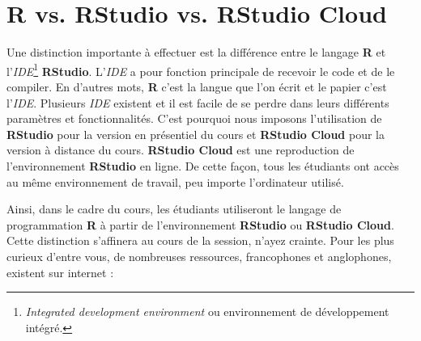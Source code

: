 \documentclass[10.5pt,a4paper]{article}
\begin{document}
\section{R vs. RStudio vs. RStudio Cloud}\label{R vs RStudio vs RStudio Cloud}

Une distinction importante à effectuer est la différence entre le langage \textbf{R} et l'\textit{IDE}\footnote{\emph{Integrated development environment} ou environnement de développement intégré.} \textbf{RStudio}. L'\textit{IDE} a pour fonction principale de recevoir le code et de le compiler. En d'autres mots, \textbf{R} c'est la langue que l'on écrit et le papier c'est l'\textit{IDE}. Plusieurs \textit{IDE} existent et il est facile de se perdre dans leurs différents paramètres et fonctionnalités. C'est pourquoi nous imposons l'utilisation de \textbf{RStudio} pour la version en présentiel du cours et \textbf{RStudio Cloud} pour la version à distance du cours. \textbf{RStudio Cloud} est une reproduction de l'environnement \textbf{RStudio} en ligne. De cette façon, tous les étudiants ont accès au même environnement de travail, peu importe l'ordinateur utilisé.  

Ainsi, dans le cadre du cours, les étudiants utiliseront le langage de programmation \textbf{R} à partir de l'environnement \textbf{RStudio} ou \textbf{RStudio Cloud}. Cette distinction s'affinera au cours de la session, n'ayez crainte. Pour les plus curieux d'entre vous, de nombreuses ressources, francophones et anglophones, existent sur internet :
\end{document}
